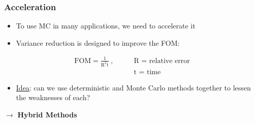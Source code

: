 \documentclass[xcolor=x11names,compress]{beamer}
\renewcommand{\(}{\begin{columns}}
\renewcommand{\)}{\end{columns}}
\newcommand{\<}[1]{\begin{column}{#1}}
\renewcommand{\>}{\end{column}}
\begin{document}
\begin{frame}[fragile]
  \frametitle{Acceleration}
  \begin{itemize}
  	\item To use MC in many applications, we need to \alert{accelerate} it
	\item Variance reduction is designed to improve the FOM:
  \end{itemize}
\begin{align}
\text{FOM} = \frac{1}{\text{R}^2\text{t}}\:,
 \qquad & \text{R = relative error} \nonumber \\ 
& \text{t = time} \nonumber 
\end{align}
  \begin{itemize}
  	\item \underline{Idea}: can we use deterministic and Monte Carlo methods together to lessen the weaknesses of each?
  \end{itemize}
  \pause
  $\rightarrow$ \textbf{Hybrid Methods}

\end{frame}
\end{document}
